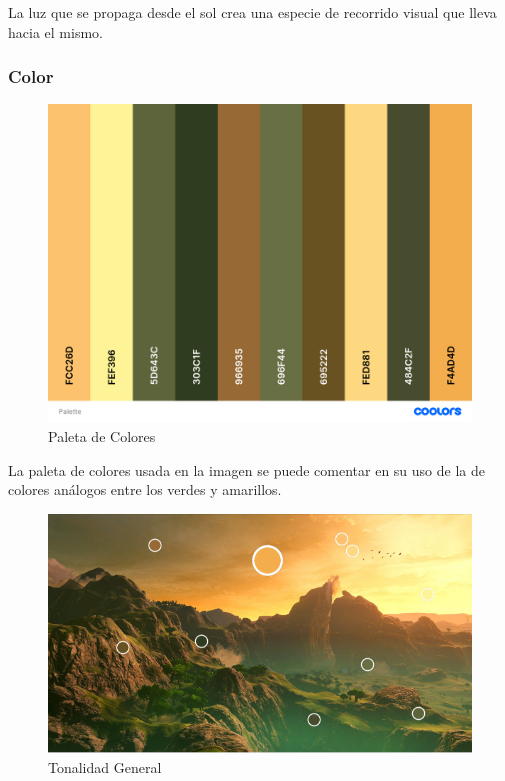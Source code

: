 \documentclass[12pt]{article}
\begin{document}
          La luz que se propaga desde el sol crea una especie de recorrido visual que lleva hacia el mismo. 


        \subsubsection{Color}

          \begin{figure}[H]
            \centering
            \includegraphics[scale = 0.2]{images/Jesus/Seccion16/palette.png}
            \caption{Paleta de Colores}
          \end{figure} 

          La paleta de colores usada en la imagen se puede comentar en su uso de la de colores análogos entre los verdes y amarillos.

          \begin{figure}[H]
            \centering
            \includegraphics[scale = 0.75]{images/Jesus/Seccion16/Tonalidad.png}
            \caption{Tonalidad General}
          \end{figure} 
\end{document}

